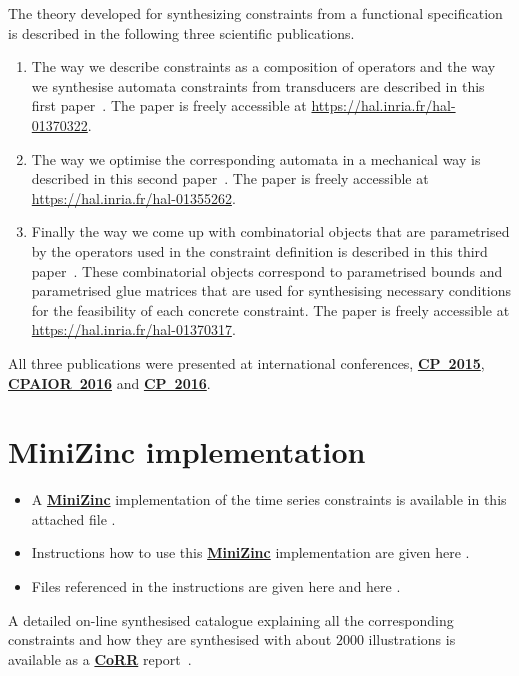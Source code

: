 \documentclass{article}
\begin{document}
The theory developed for synthesizing constraints from a functional specification is described in the following
three scientific publications.
\begin{enumerate}
\item
The way we describe constraints as a composition of operators and the way we synthesise
automata constraints from transducers are described in this first paper~\cite{CP15}.
The paper is freely accessible at \url{https://hal.inria.fr/hal-01370322}.
\item
The way we optimise the corresponding automata in a mechanical way is described in this second paper~\cite{CPAIOR16}.
The paper is freely accessible at \url{https://hal.inria.fr/hal-01355262}.
\item
Finally the way we come up with combinatorial objects that are parametrised by the operators used
in the constraint definition is described in this third paper~\cite{CP16}. These combinatorial objects
correspond to parametrised bounds and parametrised glue matrices that are used for synthesising
necessary conditions for the feasibility of each concrete constraint.
The paper is freely accessible at \url{https://hal.inria.fr/hal-01370317}.
\end{enumerate}
All three publications were presented at international conferences,
\href{http://booleconferences.ucc.ie/cp2015papers}{\bf CP~2015},
\href{https://symposia.cirrelt.ca/CPAIOR2016/en}{\bf CPAIOR~2016} and
\href{http://cp2016.a4cp.org/}{\bf CP~2016}. 

\section{MiniZinc implementation}\label{sec:minizinc}

\begin{itemize}
\item
A \href{http://www.minizinc.org/}{\bf MiniZinc} implementation of the time series constraints is available in this attached file
.
\item
Instructions how to use this \href{http://www.minizinc.org/}{\bf MiniZinc} implementation are given here
.
\item
Files referenced in the instructions are given here
and here
.
\end{itemize}

A detailed on-line synthesised catalogue explaining all the corresponding constraints
and how they are synthesised with about $2000$ illustrations is available as a
\href{https://arxiv.org/abs/1609.08925}{\bf CoRR} report~\cite{GCcat2}.

\clearpage


\end{document}
